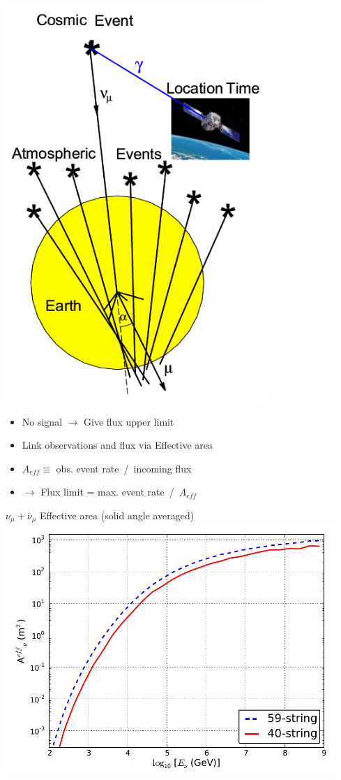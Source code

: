 \twocolumn
\begin{center}
\includegraphics[keepaspectratio,height=15cm]{atm-bkg}
\end{center}

\newpage

\begin{itemize}
\item No signal $\rightarrow$ Give flux upper limit
\item Link observations and flux via Effective area
\item[] $ A_{eff} \equiv$ obs. event rate~/~incoming flux
\item[] $\rightarrow$ Flux limit = max. event rate~/~$A_{eff}$
\end{itemize}
%
\begin{center}
{\blue $\nu_{\mu}+\bar{\nu}_{\mu}$ Effective area (solid angle averaged)}\\
\includegraphics[keepaspectratio,height=9.5cm]{ic59+40-eff-area}
\end{center}

